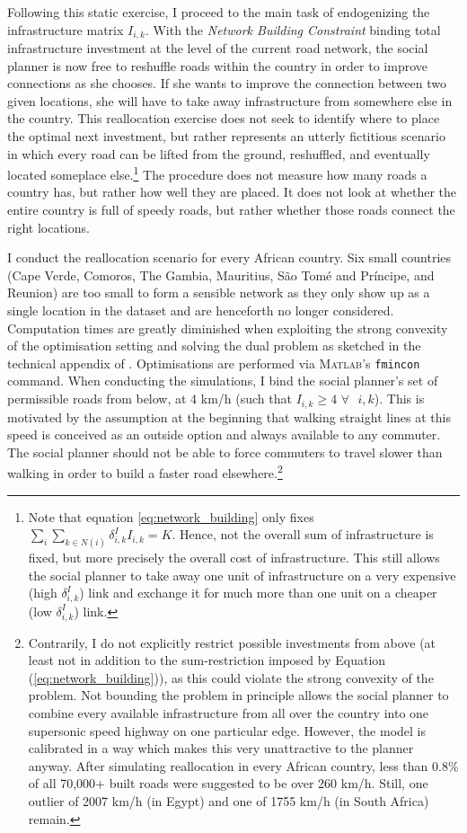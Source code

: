\documentclass[11pt, oneside]{article}   	%
\let\oldref\ref
\renewcommand{\ref}[1]{(\oldref{#1})}
\begin{document}
Following this static exercise, I proceed to the main task of endogenizing the infrastructure matrix $I_{i,k}$. With the \emph{Network Building Constraint} binding total infrastructure investment at the level of the current road network, the social planner is now free to reshuffle roads within the country in order to improve connections as she chooses. If she wants to improve the connection between two given locations, she will have to take away infrastructure from somewhere else in the country. This reallocation exercise does not seek to identify where to place the optimal next investment, but rather represents an utterly fictitious scenario in which every road can be lifted from the ground, reshuffled, and eventually located someplace else.\footnote{Note that equation \eqref{eq:network_building} only fixes $\sum_{i}^{}\sum_{k \in N(i)}^{} \delta_{i,k}^{I}I_{i,k} = K$. Hence, not the overall sum of infrastructure is fixed, but more precisely the overall cost of infrastructure. This still allows the social planner to take away one unit of infrastructure on a very expensive (high $\delta_{i,k}^{I}$) link and exchange it for much more than one unit on a cheaper (low $\delta_{i,k}^{I}$) link.} The procedure does not measure how many roads a country has, but rather how well they are placed. It does not look at whether the entire country is full of speedy roads, but rather whether those roads connect the right locations.

I conduct the reallocation scenario for every African country. Six small countries (Cape Verde, Comoros, The Gambia, Mauritius, São Tomé and Príncipe, and Reunion) are too small to form a sensible network as they only show up as a single location in the dataset and are henceforth no longer considered. Computation times are greatly diminished when exploiting the strong convexity of the optimisation setting and solving the dual problem as sketched in the technical appendix of \cite{fajgelbaum_optimal_2017}. Optimisations are performed via \textsc{Matlab}'s \texttt{fmincon} command. When conducting the simulations, I bind the social planner's set of permissible roads from below, at 4 km/h (such that $I_{i,k} \geq 4$ $ \forall \textrm{ } i,k$). This is motivated by the assumption at the beginning that walking straight lines at this speed is conceived as an outside option and always available to any commuter. The social planner should not be able to force commuters to travel slower than walking in order to build a faster road elsewhere.\footnote{Contrarily, I do not explicitly restrict possible investments from above (at least not in addition to the sum-restriction imposed by Equation \ref{eq:network_building}), as this could violate the strong convexity of the problem. Not bounding the problem in principle allows the social planner to combine every available infrastructure from all over the country into one supersonic speed highway on one particular edge. However, the model is calibrated in a way which makes this very unattractive to the planner anyway. After simulating reallocation in every African country, less than 0.8\% of all 70,000+ built roads were suggested to be over 260 km/h. Still, one outlier of 2007 km/h (in Egypt) and one of 1755 km/h (in South Africa) remain.}
\end{document}
